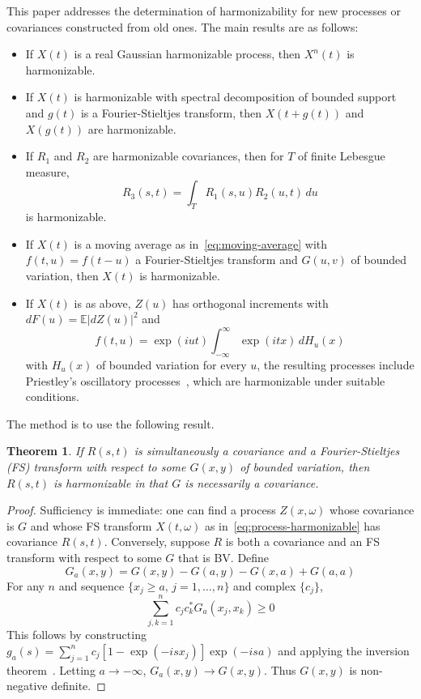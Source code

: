 \documentclass[11pt]{article}
\theoremstyle{plain}
\newtheorem{theorem}{Theorem}[section]
\theoremstyle{definition}
\theoremstyle{remark}
\begin{document}
This paper addresses the determination of harmonizability for new processes or covariances constructed from old ones. The main results are as follows:
\begin{itemize}
    \item If $X(t)$ is a real Gaussian harmonizable process, then $X^n(t)$ is harmonizable.
    \item If $X(t)$ is harmonizable with spectral decomposition of bounded support and $g(t)$ is a Fourier-Stieltjes transform, then $X(t+g(t))$ and $X(g(t))$ are harmonizable.
    \item If $R_1$ and $R_2$ are harmonizable covariances, then for $T$ of finite Lebesgue measure,
    \begin{equation}
    R_3(s,t) = \int_{T} R_1(s,u)R_2(u,t) \, du
    \label{eq:integral-composed}
    \end{equation}
    is harmonizable.
    \item If $X(t)$ is a moving average as in~\eqref{eq:moving-average} with $f(t,u) = f(t-u)$ a Fourier-Stieltjes transform and $G(u,v)$ of bounded variation, then $X(t)$ is harmonizable.
    \item If $X(t)$ is as above, $Z(u)$ has orthogonal increments with $dF(u) = \mathbb{E}|dZ(u)|^2$ and
    \begin{equation}
    f(t,u) = \exp(iut) \int_{-\infty}^{\infty} \exp(itx) \, dH_u(x)
    \label{eq:oscillatory-fn}
    \end{equation}
    with $H_u(x)$ of bounded variation for every $u$, the resulting processes include Priestley's oscillatory processes~\cite{priestley1965evolutionary}, which are harmonizable under suitable conditions.
\end{itemize}

The method is to use the following result.

\begin{theorem}
\label{thm:covariance-fs}
If $R(s,t)$ is simultaneously a covariance and a Fourier-Stieltjes (FS) transform with respect to some $G(x,y)$ of bounded variation, then $R(s,t)$ is harmonizable in that $G$ is necessarily a covariance.
\end{theorem}

\begin{proof}
Sufficiency is immediate: one can find a process $Z(x,\omega)$ whose covariance is $G$ and whose FS transform $X(t,\omega)$ as in~\eqref{eq:process-harmonizable} has covariance $R(s,t)$. Conversely, suppose $R$ is both a covariance and an FS transform with respect to some $G$ that is BV. Define
\begin{equation}
G_a(x,y) = G(x,y) - G(a,y) - G(x,a) + G(a, a)
\label{eq:nnd-Ga}
\end{equation}
For any $n$ and sequence $\{x_j \ge a,\, j=1,\ldots,n\}$ and complex $\{c_j\}$,
\[
\sum_{j,k=1}^n c_j c_k^* G_a(x_j, x_k) \ge 0
\]
This follows by constructing $g_a(s) = \sum_{j=1}^n c_j [1 - \exp(-isx_j)] \exp(-isa)$ and applying the inversion theorem~\cite[p.~475]{loeve1955probability}. Letting $a \to -\infty$, $G_a(x,y) \to G(x,y)$. Thus $G(x,y)$ is non-negative definite.
\end{proof}
\end{document}
